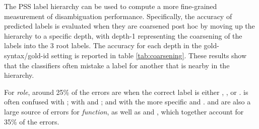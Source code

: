 The PSS label hierarchy can be used to compute a more fine-grained measurement of disambiguation performance.  Specifically, the accuracy of predicted labels is evaluated when they are coarsened post hoc by moving up the hierarchy to a specific depth, with depth-1 representing the coarsening of the labels into the 3 root labels. The accuracy for each depth in the gold-syntax/gold-id setting is reported in table \ref{tab:coarsening}. These
results show that the classifiers often mistake a label for another that is nearby in the hierarchy.

For \textit{role}, around 25\% of the errors are when the correct label is either , , or .   is often confused with  ;  with  and ; and  with the more specific  and . 
 and  are also a large source of errors for \textit{function}, as well as  and , which together account for 35\% of the errors.


